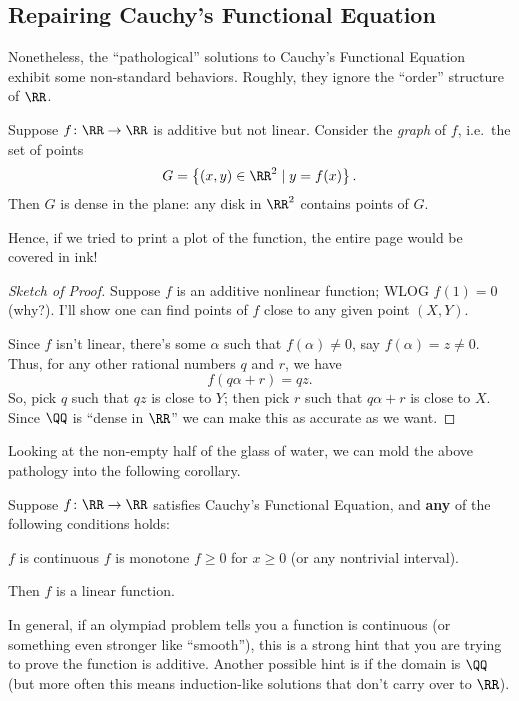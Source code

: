 \documentclass[11pt]{scrartcl}
\begin{document}
\subsection{Repairing Cauchy's Functional Equation}
Nonetheless, the ``pathological'' solutions to Cauchy's Functional Equation
exhibit some non-standard behaviors.
Roughly, they ignore the ``order'' structure of $\RR$.

\begin{theorem}
  Suppose $f \colon \RR \to \RR$ is additive but not linear.
  Consider the \emph{graph} of $f$, i.e.\ the set of points
  \[ G = \left\{ (x,y) \in \RR^2 \mid y = f(x) \right\}. \]
  Then $G$ is dense in the plane:
  any disk in $\RR^2$ contains points of $G$.
\end{theorem}
Hence, if we tried to print a plot of the function,
the entire page would be covered in ink!
\begin{proof}[Sketch of Proof]
  Suppose $f$ is an additive nonlinear function; WLOG $f(1) = 0$ (why?).
  I'll show one can find points of $f$ close to any given point $(X,Y)$.

  Since $f$ isn't linear, there's some $\alpha$ such that $f(\alpha) \neq 0$,
  say $f(\alpha) = z \neq 0$.
  Thus, for any other rational numbers $q$ and $r$, we have
  \[ f(q\alpha+r) = qz. \]
  So, pick $q$ such that $qz$ is close to $Y$;
  then pick $r$ such that $q\alpha+r$ is close to $X$.
  Since $\QQ$ is ``dense in $\RR$'' we can make this as accurate as we want.
\end{proof}

Looking at the non-empty half of the glass of water,
we can mold the above pathology into the following corollary.
\begin{corollary}
  Suppose $f \colon \RR \to \RR$ satisfies Cauchy's Functional Equation,
  and \textbf{any} of the following conditions holds:
  \begin{itemize}
    \ii $f$ is continuous
    \ii $f$ is monotone
    \ii $f \ge 0$ for $x \ge 0$ (or any nontrivial interval).
  \end{itemize}
  Then $f$ is a linear function.
\end{corollary}

In general, if an olympiad problem tells you a function is continuous
(or something even stronger like ``smooth''),
this is a strong hint that you are trying to prove the function is additive.
Another possible hint is if the domain is $\QQ$ (but more often this
means induction-like solutions that don't carry over to $\RR$).
\end{document}
